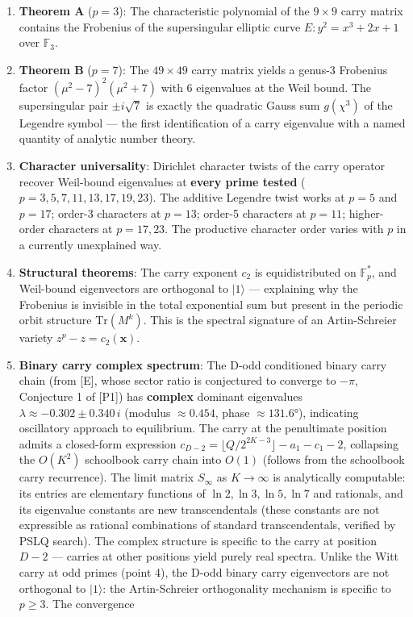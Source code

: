 \documentclass[
  11pt,
]{article}
\begin{document}
\begin{enumerate}
\def\labelenumi{\arabic{enumi}.}
\item
  \textbf{Theorem A} (\(p = 3\)): The characteristic polynomial of the
  \(9 \times 9\) carry matrix contains the Frobenius of the supersingular
  elliptic curve \(E: y^2 = x^3 + 2x + 1\) over \(\mathbb{F}_3\).
\item
  \textbf{Theorem B} (\(p = 7\)): The \(49 \times 49\) carry matrix yields a
  genus-3 Frobenius factor \((\mu^2 - 7)^2(\mu^2 + 7)\) with 6 eigenvalues at
  the Weil bound. The supersingular pair \(\pm i\sqrt{7}\) is exactly the
  quadratic Gauss sum \(g(\chi^3)\) of the Legendre symbol --- the first
  identification of a carry eigenvalue with a named quantity of analytic number
  theory.
\item
  \textbf{Character universality}: Dirichlet character twists of the carry
  operator recover Weil-bound eigenvalues at \textbf{every prime tested}
  (\(p = 3, 5, 7, 11, 13, 17, 19, 23\)). The additive Legendre twist works at
  \(p = 5\) and \(p = 17\); order-3 characters at \(p = 13\); order-5 characters
  at \(p = 11\); higher-order characters at \(p = 17, 23\). The productive
  character order varies with \(p\) in a currently unexplained way.
\item
  \textbf{Structural theorems}: The carry exponent \(c_2\) is equidistributed on
  \(\mathbb{F}_p^{\ast}\), and Weil-bound eigenvectors are orthogonal to
  \(\lvert 1\rangle\) --- explaining why the Frobenius is invisible in the total
  exponential sum but present in the periodic orbit structure
  \(\mathrm{Tr}(M^k)\). This is the spectral signature of an Artin-Schreier
  variety \(z^p - z = c_2(\boldsymbol{x})\).
\item
  \textbf{Binary carry complex spectrum}: The D-odd conditioned binary carry
  chain (from {[}E{]}, whose sector ratio is conjectured to converge to
  \(-\pi\), Conjecture 1 of {[}P1{]}) has \textbf{complex} dominant eigenvalues
  \(\lambda \approx -0.302 \pm 0.340\,i\) (modulus \(\approx 0.454\), phase
  \(\approx 131.6°\)), indicating oscillatory approach to equilibrium. The carry
  at the penultimate position admits a closed-form expression
  \(c_{D-2} = \lfloor Q / 2^{2K-3} \rfloor - a_1 - c_1 - 2\), collapsing the
  \(O(K^2)\) schoolbook carry chain into \(O(1)\) (follows from the schoolbook
  carry recurrence). The limit matrix \(S_\infty\) as \(K \to \infty\) is
  analytically computable: its entries are elementary functions of
  \(\ln 2, \ln 3, \ln 5, \ln 7\) and rationals, and its eigenvalue constants are
  new transcendentals (these constants are not expressible as rational
  combinations of standard transcendentals, verified by PSLQ search). The
  complex structure is specific to the carry at position \(D-2\) --- carries at
  other positions yield purely real spectra. Unlike the Witt carry at odd primes
  (point 4), the D-odd binary carry eigenvectors are not orthogonal to
  \(\lvert 1\rangle\): the Artin-Schreier orthogonality mechanism is specific to
  \(p \geq 3\). The convergence
\end{enumerate}
\end{document}

